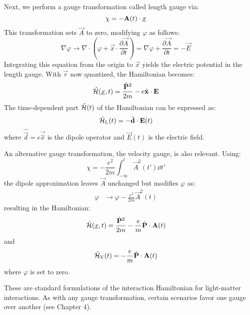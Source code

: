 Next, we perform a gauge transformation called length gauge via:
\begin{equation}
    \chi = -\mathbf{A}(t)\cdot \underline{x}
\end{equation}
This transformation sets $\vec{A}$ to zero, modifying $\varphi$ as follows:%
\begin{equation}
    \nabla \varphi \to \nabla \cdot (\varphi + \vec{x} \cdot \frac{\partial \vec{A}}{\partial t}) = \nabla \varphi + \frac{\partial \vec{A}}{\partial t} = - \vec{E}
\end{equation}
Integrating this equation from the origin to $\vec{x}$ yields the electric potential in the length gauge. 
With $\vec{r}$ now quantized, the Hamiltonian becomes:
\begin{equation*}%
    \hat{\Hs}(\uvec{x}, t) = \frac{\hat{\vec{P}}^2}{2m} - e \hat{\vec{x}} \cdot \vec{E}%
\end{equation*}
The time-dependent part $\hat{\mathcal{H}}(t)$ of the Hamiltonian can be expressed as:
\begin{equation}
    \hat{\mathcal{H}}_{\mathrm{L}}(t) = -\hat{\mathbf{d}} \cdot \mathbf{E}(t) \label{eq:dipoleApprox}
\end{equation}
where $\hat{\vec{d}}=e\vec{\hat{x}}$ is the dipole operator and $\vec{E}(t)$ is the electric field.

An alternative gauge transformation, the velocity gauge, is also relevant. 
Using:
\begin{equation*}
    \chi = -\frac{e^2}{2m}\int_{-\infty}^{t} \vec{A}^2(t') \dd t'
\end{equation*}
the dipole approximation leaves $\vec{A}$ unchanged but modifies $\varphi$ as:
\begin{align*}
    \varphi &\to \varphi -\frac{e^2}{2m}\vec{A}^2(t)
\end{align*}
resulting in the Hamiltonian:
\begin{equation*}
    \hat{\mathcal{H}}(\underline{x}, t) = \frac{\hat{\mathbf{P}}^2}{2m} -\frac{e}{m}\hat{\mathbf{P}} \cdot \mathbf{A}(t)
\end{equation*}
and
\begin{equation}
    \hat{\mathcal{H}}_{\mathrm{V}}(t) = -\frac{e}{m}\hat{\mathbf{P}} \cdot \mathbf{A}(t) \label{eq:dipoleApprox_velocity}
\end{equation}
where $\varphi$ is set to zero.

These are standard formulations of the interaction Hamiltonian for light-matter interactions. 
As with any gauge transformation, certain scenarios favor one gauge over another (see Chapter 4).



